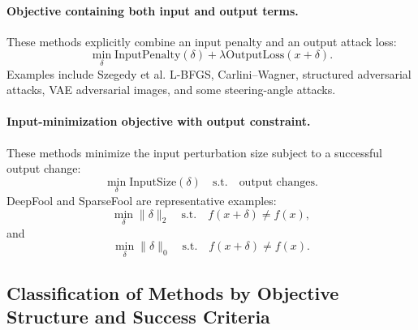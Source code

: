 \documentclass{article}
\begin{document}
\paragraph{Objective containing both input and output terms.}
These methods explicitly combine an input penalty and an output attack loss:
\[
    \min_\delta
    \mathrm{InputPenalty}(\delta)
    +
    \lambda \mathrm{OutputLoss}(x+\delta).
\]
Examples include Szegedy et al. L-BFGS, Carlini--Wagner, structured adversarial attacks, VAE adversarial images, and some steering-angle attacks.

\paragraph{Input-minimization objective with output constraint.}
These methods minimize the input perturbation size subject to a successful output change:
\[
    \min_\delta \mathrm{InputSize}(\delta)
    \quad
    \text{s.t.}
    \quad
    \text{output changes}.
\]
DeepFool and SparseFool are representative examples:
\[
    \min_\delta \|\delta\|_2
    \quad
    \text{s.t.}
    \quad
    f(x+\delta)\neq f(x),
\]
and
\[
    \min_\delta \|\delta\|_0
    \quad
    \text{s.t.}
    \quad
    f(x+\delta)\neq f(x).
\]

\subsection{Classification of Methods by Objective Structure and Success Criteria}
\end{document}
